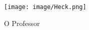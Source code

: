 \documentclass{article}
\begin{document}
  \begin{figure}[!h]
    \centering
    \texttt{[image: image/Heck.png]}
    \caption{O Professor}
  \end{figure}
\end{document}
